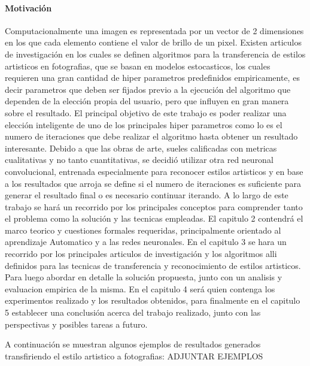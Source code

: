 \documentclass[a4paper,10pt]{article}
\begin{document}
  \paragraph{Motivación}
  Computacionalmente una imagen es representada por un vector de 2 dimensiones en los que cada elemento contiene el valor de brillo de un pixel.
  Existen articulos de investigación en los cuales se definen algoritmos para la transferencia de estilos artisticos en fotografias, que se basan en modelos estocasticos, 
  los cuales requieren una gran cantidad de hiper parametros predefinidos empiricamente, es decir parametros que deben ser fijados previo a la ejecución del algoritmo que dependen 
  de la elección propia del usuario, pero que influyen en gran manera sobre el resultado.
  El principal objetivo de este trabajo es poder realizar una elección inteligente de uno de los principales hiper parametros como lo es el numero de iteraciones 
  que debe realizar el algoritmo hasta obtener un resultado interesante.
  Debido a que las obras de arte, sueles calificadas con metricas cualitativas y no tanto cuantitativas, se decidió utilizar otra red neuronal convolucional, 
  entrenada especialmente para reconocer estilos artisticos y en base a los resultados que arroja se define si el numero de iteraciones es suficiente para generar el resultado final 
  o es necesario continuar iterando.
  A lo largo de este trabajo se hará un recorrido por los principales conceptos para comprender tanto el problema como la solución y las tecnicas empleadas.
  El capitulo 2 contendrá el marco teorico y cuestiones formales requeridas, principalmente orientado al aprendizaje Automatico y a las redes neuronales.
  En el capitulo 3 se hara un recorrido por los principales articulos de investigación y los algoritmos alli definidos para las tecnicas de transferencia y reconocimiento de estilos artisticos.
  Para luego abordar en detalle la solución propuesta, junto con un analisis y evaluacion empirica de la misma.
  En el capitulo 4 será quien contenga los experimentos realizado y los resultados obtenidos, para finalmente en el capitulo 5 establecer una conclusión acerca del trabajo realizado, 
  junto con las perspectivas y posibles tareas a futuro.

A continuación se muestran algunos ejemplos de resultados generados transfiriendo el estilo artistico a fotografias:
ADJUNTAR EJEMPLOS
\end{document}
